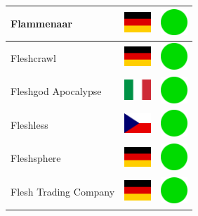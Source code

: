 \documentclass[12pt, a4paper, twoside]{report}
\begin{document}
\begin{center}
\begin{longtable}{|p{5cm}|p{2cm}|p{2cm}|}
 Flammenaar                                                 & \includegraphics[width=1cm]{../4x3/de} &   \includegraphics[width=1cm]{../likes/y} \\ \hline
 Fleshcrawl                                                 & \includegraphics[width=1cm]{../4x3/de} &   \includegraphics[width=1cm]{../likes/y} \\ \hline
 Fleshgod Apocalypse                                        & \includegraphics[width=1cm]{../4x3/it} &   \includegraphics[width=1cm]{../likes/y} \\ \hline
 Fleshless                                                  & \includegraphics[width=1cm]{../4x3/cz} &   \includegraphics[width=1cm]{../likes/y} \\ \hline
 Fleshsphere                                                & \includegraphics[width=1cm]{../4x3/de} &   \includegraphics[width=1cm]{../likes/y} \\ \hline
 Flesh Trading Company                                      & \includegraphics[width=1cm]{../4x3/de} &   \includegraphics[width=1cm]{../likes/y} \\ \hline

\end{longtable}
\end{center}
\end{document}
